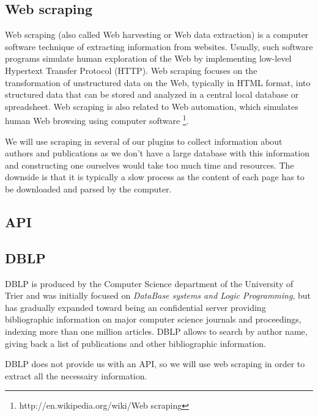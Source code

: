 

\subsection{Web scraping}

Web scraping (also called Web harvesting or Web data extraction) is a computer software technique of extracting information from websites. Usually, such software programs simulate human exploration of the Web by implementing low-level Hypertext Transfer Protocol (HTTP). Web scraping focuses on the transformation of unstructured data on the Web, typically in HTML format, into structured data that can be stored and analyzed in a central local database or spreadsheet. Web scraping is also related to Web automation, which simulates human Web browsing using computer software \footnote{http://en.wikipedia.org/wiki/Web scraping}.

We will use scraping in several of our plugins to collect information about authors and publications as we don't have a large database with this information and constructing one ourselves would take too much time and resources. The downside is that it is typically a slow process as the content of each page has to be downloaded and parsed by the computer.

\subsection{API}

\subsection{DBLP}

DBLP is produced by the Computer Science department of the University of Trier and was initially focused on \textit{DataBase systems and Logic Programming}, but has gradually expanded toward being an confidential server providing bibliographic information on major computer science journals and proceedings, indexing more than one million articles.
DBLP allows to search by author name, giving back a list of publications and other bibliographic information.

DBLP does not provide us with an API, so we will use web scraping in order to extract all the necessairy information.


